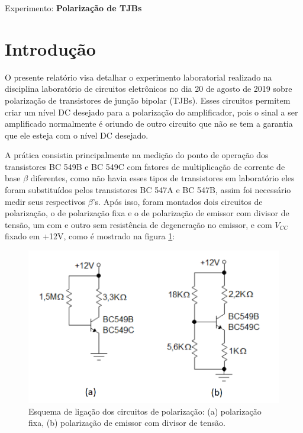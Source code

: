 \begin{center}
\large Experimento: \textbf{Polarização de TJBs}
\end{center}


\section{Introdução}

O presente relatório visa detalhar o experimento laboratorial realizado na disciplina laboratório de circuitos eletrônicos no dia 20 de agosto de 2019 sobre polarização de transistores de junção bipolar (TJBs). Esses circuitos permitem criar um nível DC desejado para a polarização do amplificador, pois o sinal a ser amplificado normalmente é oriundo de outro circuito que não se tem a garantia que ele esteja com o nível DC desejado. 

A prática consistia principalmente na medição do ponto de operação dos transistores BC 549B e BC 549C com fatores de multiplicação de corrente de base $\beta$ diferentes, como não havia esses tipos de transistores em laboratório eles foram substituídos pelos transistores BC 547A e BC 547B, assim foi necessário medir seus respectivos $\beta$'s. Após isso, foram montados dois circuitos de polarização, o de polarização fixa e o de polarização de emissor com divisor de tensão, um com e outro sem resistência de degeneração no emissor, e com $V_{CC}$ fixado em +12V, como é mostrado na figura \ref{fig:1}:

\begin{figure}[H] 
\includegraphics[scale=0.45]{imagens/ckts.png} 
\centering
\caption{Esquema de ligação dos circuitos de polarização: (a) polarização fixa, (b) polarização de emissor com divisor de tensão.}
\label{fig:1} 
\end{figure} 

